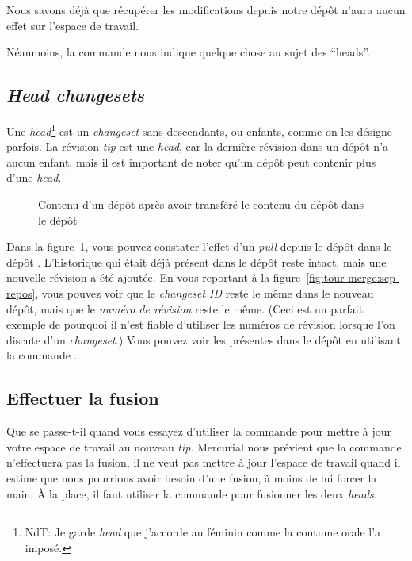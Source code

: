 Nous savons déjà que récupérer les modifications depuis notre dépôt 
 n'aura aucun effet sur l'espace de travail.


Néanmoins, la commande  nous indique quelque chose au 
sujet des ``heads''.

\subsection{\textit{Head changesets}} %

Une \textit{head}\footnote{NdT: Je garde \textit{head} que j'accorde 
au féminin comme la coutume orale l'a imposé.} est un \textit{changeset} 
sans descendants, ou enfants, comme on les désigne parfois. La révision 
\textit{tip} est une \textit{head}, car la dernière révision dans un dépôt 
n'a aucun enfant, mais il est important de noter qu'un dépôt peut contenir 
plus d'une \textit{head}.

\begin{figure}[ht]
  \centering
  \caption{Contenu d'un dépôt après avoir transféré le contenu du dépôt 
     dans le dépôt }
  \label{fig:tour-merge:pull}
\end{figure}

Dans la figure~\ref{fig:tour-merge:pull}, vous pouvez constater l'effet
d'un \textit{pull} depuis le dépôt  dans le dépôt 
. L'historique qui était déjà présent dans le dépôt
 reste intact, mais une nouvelle révision a été 
ajoutée. En vous reportant à la figure~\ref{fig:tour-merge:sep-repos},
vous pouvez voir que le \textit{\emph{changeset ID}} reste le même dans
le nouveau dépôt, mais que le \emph{numéro de révision} reste le même.
(Ceci est un parfait exemple de pourquoi il n'est fiable d'utiliser les
numéros de révision lorsque l'on discute d'un \textit{changeset}.) Vous
pouvez voir les  présentes dans le dépôt en utilisant la 
commande .

\subsection{Effectuer la fusion}

Que se passe-t-il quand vous essayez d'utiliser la commande  
pour mettre à jour votre espace de travail au nouveau \textit{tip}.
Mercurial nous prévient que la commande  n'effectuera pas
la fusion, il ne veut pas mettre à jour l'espace de travail quand il 
estime que nous pourrions avoir besoin d'une fusion, à moins de lui
forcer la main. À la place, il faut utiliser la commande 
pour fusionner les deux \textit{heads}.

